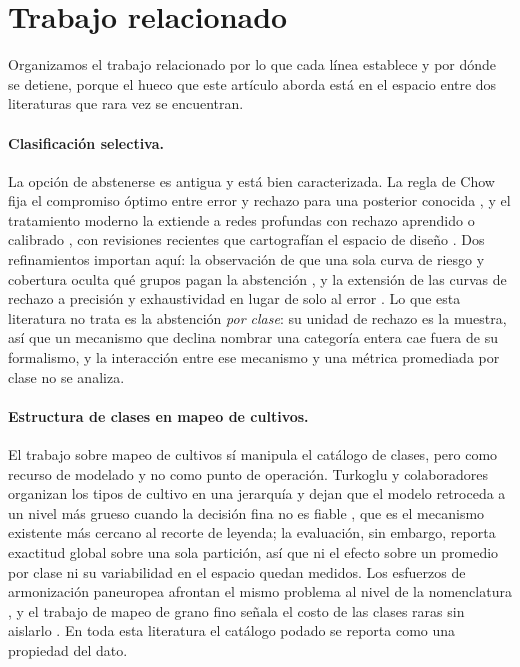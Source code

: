 \section{Trabajo relacionado}
\label{sec:relacionado}

Organizamos el trabajo relacionado por lo que cada línea establece y por dónde se detiene, porque
el hueco que este artículo aborda está en el espacio entre dos literaturas que rara vez se
encuentran.

\paragraph{Clasificación selectiva.}
La opción de abstenerse es antigua y está bien caracterizada. La regla de Chow fija el compromiso
óptimo entre error y rechazo para una posterior conocida \cite{chow1970reject}, y el tratamiento
moderno la extiende a redes profundas con rechazo aprendido o calibrado
\cite{geifman2017selective,geifman2019selectivenet,liu2019deepgamblers}, con revisiones recientes
que cartografían el espacio de diseño \cite{hendrickx2024rejectsurvey,hasan2023uncertaintysurvey}.
Dos refinamientos importan aquí: la observación de que una sola curva de riesgo y cobertura oculta
qué grupos pagan la abstención \cite{jones2020selectivedisparities}, y la extensión de las curvas
de rechazo a precisión y exhaustividad en lugar de solo al error
\cite{fischer2023rejectcurves,pugnana2022aucselective}. Lo que esta literatura no trata es la
abstención \emph{por clase}: su unidad de rechazo es la muestra, así que un mecanismo que declina
nombrar una categoría entera cae fuera de su formalismo, y la interacción entre ese mecanismo y
una métrica promediada por clase no se analiza.

\paragraph{Estructura de clases en mapeo de cultivos.}
El trabajo sobre mapeo de cultivos sí manipula el catálogo de clases, pero como recurso de
modelado y no como punto de operación. Turkoglu y colaboradores organizan los tipos de cultivo en
una jerarquía y dejan que el modelo retroceda a un nivel más grueso cuando la decisión fina no es
fiable \cite{turkoglu2021hierarchies}, que es el mecanismo existente más cercano al recorte de
leyenda; la evaluación, sin embargo, reporta exactitud global sobre una sola partición, así que ni
el efecto sobre un promedio por clase ni su variabilidad en el espacio quedan medidos. Los
esfuerzos de armonización paneuropea afrontan el mismo problema al nivel de la nomenclatura
\cite{schneider2021eurocrops,claverie2026eurocropsv2}, y el trabajo de mapeo de grano fino señala
el costo de las clases raras sin aislarlo
\cite{lei2025finecrop,li2021costeffective,donmez2025cropcover}. En toda esta literatura el catálogo
podado se reporta como una propiedad del dato.

